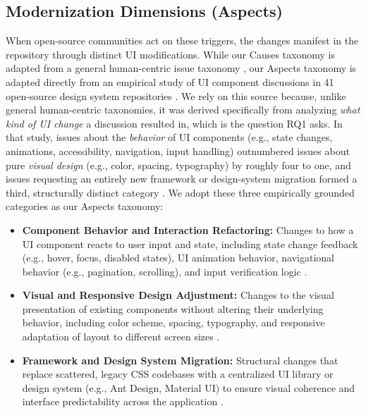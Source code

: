 \documentclass{article}
\begin{document}
\subsection{Modernization Dimensions (Aspects)}
\label{sec:aspects}
When open-source communities act on these triggers, the changes manifest in
the repository through distinct UI modifications. While our Causes taxonomy
is adapted from a general human-centric issue taxonomy
\cite{khalajzadeh2022how}, our Aspects taxonomy is adapted directly from an
empirical study of UI component discussions in 41 open-source design
system repositories \cite{lamine2022understanding}. We rely on this source
because, unlike general human-centric taxonomies, it was derived
specifically from analyzing \emph{what kind of UI change} a discussion
resulted in, which is the question RQ1 asks. In that study, issues about
the \emph{behavior} of UI components (e.g., state changes, animations,
accessibility, navigation, input handling) outnumbered issues about pure
\emph{visual design} (e.g., color, spacing, typography) by roughly four to
one, and issues requesting an entirely new framework or design-system
migration formed a third, structurally distinct category
\cite{lamine2022understanding}. We adopt these three empirically grounded
categories as our Aspects taxonomy:
\begin{itemize}
    \item \textbf{Component Behavior and Interaction Refactoring:} Changes
    to how a UI component reacts to user input and state, including state
    change feedback (e.g., hover, focus, disabled states), UI animation
    behavior, navigational behavior (e.g., pagination, scrolling), and
    input verification logic \cite{lamine2022understanding}.
    \item \textbf{Visual and Responsive Design Adjustment:} Changes to the
    visual presentation of existing components without altering their
    underlying behavior, including color scheme, spacing, typography, and
    responsive adaptation of layout to different screen sizes
    \cite{lamine2022understanding, wang2022how}.
    \item \textbf{Framework and Design System Migration:} Structural
    changes that replace scattered, legacy CSS codebases with a
    centralized UI library or design system (e.g., Ant Design, Material
    UI) to ensure visual coherence and interface predictability across the
    application \cite{wang2022how, lamine2022understanding}.
\end{itemize}
\end{document}
